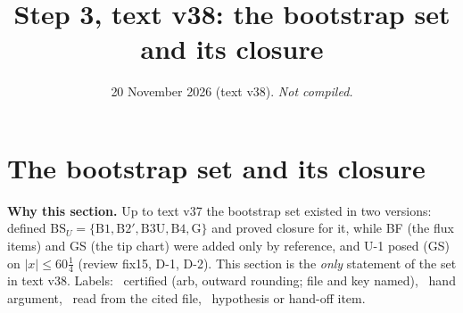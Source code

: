 \documentclass[11pt]{article}
\title{Step 3, text v38: the bootstrap set and its closure}
\author{}\date{20 November 2026 (text v38). \emph{Not compiled.}}
\begin{document}
\maketitle
\fi

\section{The bootstrap set and its closure}\label{BS:sec}
\noindent\textbf{Why this section.} Up to text v37 the bootstrap set existed in two versions:  defined $\mathrm{BS}_U=\{\mathrm{B1},\mathrm{B2}',\mathrm{B3U},\mathrm{B4},\mathrm{G}\}$ and proved closure for it, while BF (the flux items) and GS (the tip chart) were added only by reference, and U-1 posed (GS) on $|x|\le60\frac14$ (review fix15, D-1, D-2). This section is the \emph{only} statement of the set in text v38. Labels: \tC\ certified (arb, outward rounding; file and key named), \tHd\ hand argument, \tR\ read from the cited file, \tH\ hypothesis or hand-off item.
\end{document}
